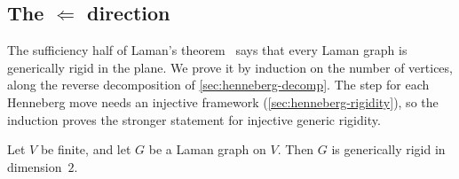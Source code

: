 \subsection{The \texorpdfstring{$\Leftarrow$}{<=} direction}

The sufficiency half of Laman's theorem~\cite{laman1970} says that
every Laman graph is generically rigid in the plane. We prove it by
induction on the number of vertices, along the reverse decomposition
of \cref{sec:henneberg-decomp}. The step for each Henneberg move needs
an injective framework (\cref{sec:henneberg-rigidity}), so the
induction proves the stronger statement for injective generic
rigidity.

\begin{theorem}
  \label{thm:isLaman-isGenericallyRigid-two}
  \leanok
  Let $V$ be finite, and let $G$ be a Laman graph on $V$. Then $G$ is
  generically rigid in dimension~$2$.
\end{theorem}
